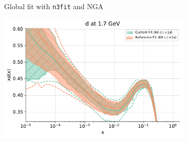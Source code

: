 \begin{frame}{Global fit with \texttt{n3fit} and NGA}
\vspace{15pt}
\begin{center}
  \includegraphics[width=0.7\textwidth]{Global_n3fit_NGA.pdf}  \\
{\centering\href{https://vp.nnpdf.science/KosxK7QHR0iBl2v21cVWpQ==}{}}
\end{center}
\end{frame}

\renewcommand{\appendixname}{\texorpdfstring{\translate{Appendix}}{Appendix}}


